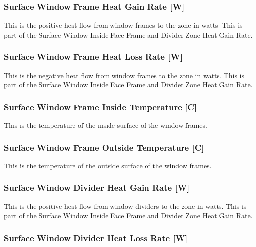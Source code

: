 \subsubsection{Surface Window Frame Heat Gain Rate {[}W{]}}\label{surface-window-frame-heat-gain-rate-w}

This is the positive heat flow from window frames to the zone in watts. This is part of the Surface Window Inside Face Frame and Divider Zone Heat Gain Rate.

\subsubsection{Surface Window Frame Heat Loss Rate {[}W{]}}\label{surface-window-frame-heat-loss-rate-w}

This is the negative heat flow from window frames to the zone in watts. This is part of the Surface Window Inside Face Frame and Divider Zone Heat Gain Rate.

\subsubsection{Surface Window Frame Inside Temperature {[}C{]}}\label{surface-window-frame-inside-temperature-c}

This is the temperature of the inside surface of the window frames.

\subsubsection{Surface Window Frame Outside Temperature {[}C{]}}\label{surface-window-frame-outside-temperature-c}

This is the temperature of the outside surface of the window frames.

\subsubsection{Surface Window Divider Heat Gain Rate {[}W{]}}\label{surface-window-divider-heat-gain-rate-w}

This is the positive heat flow from window dividers to the zone in watts. This is part of the Surface Window Inside Face Frame and Divider Zone Heat Gain Rate.

\subsubsection{Surface Window Divider Heat Loss Rate {[}W{]}}\label{surface-window-divider-heat-loss-rate-w}

